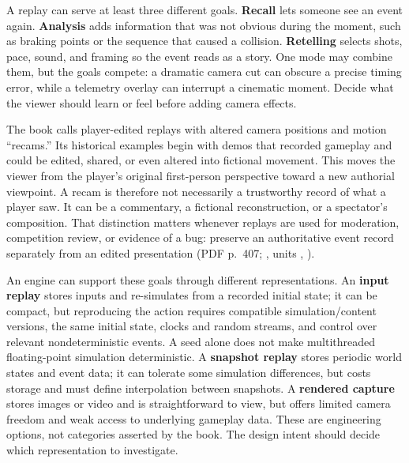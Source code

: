 A replay can serve at least three different goals. \textbf{Recall} lets someone see an event again. \textbf{Analysis} adds information that was not obvious during the moment, such as braking points or the sequence that caused a collision. \textbf{Retelling} selects shots, pace, sound, and framing so the event reads as a story. One mode may combine them, but the goals compete: a dramatic camera cut can obscure a precise timing error, while a telemetry overlay can interrupt a cinematic moment. Decide what the viewer should learn or feel before adding camera effects.

The book calls player-edited replays with altered camera positions and motion ``recams.'' Its historical examples begin with demos that recorded gameplay and could be edited, shared, or even altered into fictional movement. This moves the viewer from the player's original first-person perspective toward a new authorial viewpoint. A recam is therefore not necessarily a trustworthy record of what a player saw. It can be a commentary, a fictional reconstruction, or a spectator's composition. That distinction matters whenever replays are used for moderation, competition review, or evidence of a bug: preserve an authoritative event record separately from an edited presentation (PDF p.~407; , units , ).

An engine can support these goals through different representations. An \textbf{input replay} stores inputs and re-simulates from a recorded initial state; it can be compact, but reproducing the action requires compatible simulation/content versions, the same initial state, clocks and random streams, and control over relevant nondeterministic events. A seed alone does not make multithreaded floating-point simulation deterministic. A \textbf{snapshot replay} stores periodic world states and event data; it can tolerate some simulation differences, but costs storage and must define interpolation between snapshots. A \textbf{rendered capture} stores images or video and is straightforward to view, but offers limited camera freedom and weak access to underlying gameplay data. These are engineering options, not categories asserted by the book. The design intent should decide which representation to investigate.

